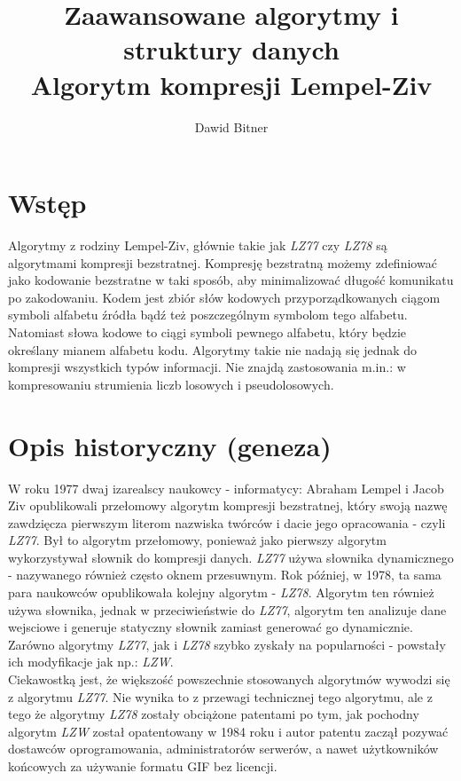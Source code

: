 \documentclass{article}
\title{Zaawansowane algorytmy i struktury danych \\ Algorytm kompresji Lempel-Ziv}
\author{Dawid Bitner}
\begin{document}
\maketitle

\section{Wstęp}
Algorytmy z rodziny Lempel-Ziv, głównie takie jak \textit{LZ77} czy \textit{LZ78} są algorytmami kompresji bezstratnej. Kompresję bezstratną możemy zdefiniować jako kodowanie bezstratne w taki sposób, aby minimalizować długość komunikatu po zakodowaniu. Kodem jest zbiór słów kodowych przyporządkowanych ciągom symboli alfabetu źródła bądź też poszczególnym  symbolom  tego  alfabetu.  Natomiast słowa  kodowe  to  ciągi  symboli  pewnego  alfabetu,  który  będzie  określany  mianem  alfabetu  kodu. Algorytmy takie nie nadają się jednak do kompresji wszystkich typów informacji. Nie znajdą zastosowania m.in.: w kompresowaniu strumienia liczb losowych i pseudolosowych.

\section{Opis historyczny (geneza)}
 W roku 1977 dwaj izarealscy naukowcy - informatycy: Abraham Lempel i Jacob Ziv opublikowali przełomowy algorytm kompresji bezstratnej, który swoją nazwę zawdzięcza pierwszym literom nazwiska twórców i dacie jego opracowania - czyli \textit{LZ77}. Był to algorytm przełomowy, ponieważ jako pierwszy algorytm wykorzystywał słownik do kompresji danych. \textit{LZ77} używa słownika dynamicznego - nazywanego również często oknem przesuwnym. Rok później, w 1978, ta sama para naukowców opublikowała kolejny algorytm - \textit{LZ78}. Algorytm ten również używa słownika, jednak w przeciwieństwie do \textit{LZ77}, algorytm ten analizuje dane wejsciowe i generuje statyczny słownik zamiast generować go dynamicznie.
 Zarówno algorytmy \textit{LZ77}, jak i \textit{LZ78} szybko zyskały na popularności - powstały ich modyfikacje jak np.: \textit{LZW}. \\
Ciekawostką jest, że większość powszechnie stosowanych algorytmów wywodzi się z algorytmu \textit{LZ77}. Nie wynika to z przewagi technicznej tego algorytmu, ale z tego że algorytmy \textit{LZ78} zostały obciążone patentami po tym, jak pochodny algorytm \textit{LZW} został opatentowany w 1984 roku i autor patentu zaczął pozywać dostawców oprogramowania, administratorów serwerów, a nawet użytkowników końcowych za używanie formatu GIF bez licencji.
\end{document}
